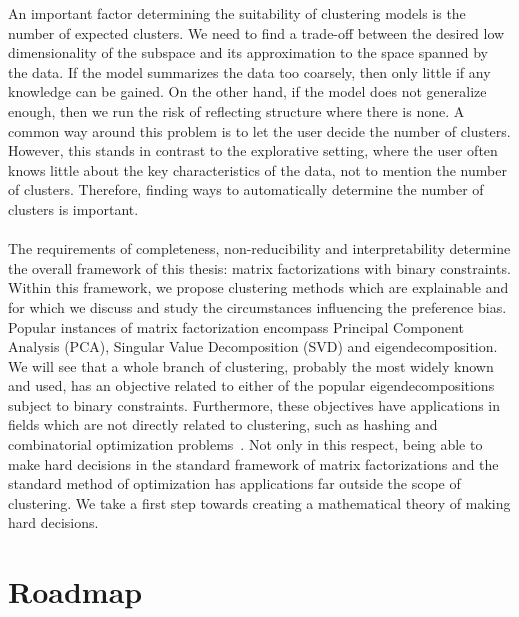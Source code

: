 An important factor determining the suitability of clustering models is the number of expected clusters. We need to find a trade-off between the desired low dimensionality of the subspace and its approximation to the space spanned by the data. If the model summarizes the data too coarsely, then only little if any knowledge can be gained. On the other hand, if the model does not generalize enough, then we run the risk of reflecting structure where there is none. A common way around this problem is to let the user decide the number of clusters. However, this stands in contrast to the explorative setting, where the user often knows little about the key characteristics of the data, not to mention the number of clusters. Therefore, finding ways to automatically determine the number of clusters is important.

\paragraph{}The requirements of completeness, non-reducibility and interpretability determine the overall framework of this thesis: matrix factorizations with binary constraints. Within this framework, we propose clustering methods which are explainable and for which we discuss and study the circumstances influencing the preference bias.  Popular instances of matrix factorization encompass Principal Component Analysis (PCA), Singular Value Decomposition (SVD) and eigendecomposition. We will see that a whole branch of clustering, probably the most widely known and used, has an objective related to either of the popular eigendecompositions subject to binary constraints. Furthermore, these objectives have applications in fields which are not directly related to clustering, such as hashing and combinatorial optimization problems~\citep{ding2008nonnegative,mukherjee2015nmf}. Not only in this respect, being able to make hard decisions in the standard framework of matrix factorizations and the standard method of optimization has applications far outside the scope of clustering. We take a first step towards creating a mathematical theory of making hard decisions.
\section{Roadmap}
